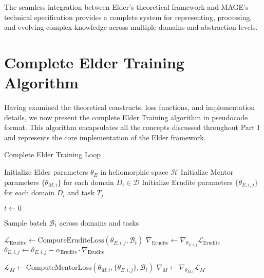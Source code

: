 The seamless integration between Elder's theoretical framework and MAGE's technical specification provides a complete system for representing, processing, and evolving complex knowledge across multiple domains and abstraction levels.

\section{Complete Elder Training Algorithm}

Having examined the theoretical constructs, loss functions, and implementation details, we now present the complete Elder Training algorithm in pseudocode format. This algorithm encapsulates all the concepts discussed throughout Part I and represents the core implementation of the Elder framework.

\begin{algorithm}
\caption{Complete Elder Training Loop}
\label{alg:elder_training}
\begin{algorithmic}[1]

\State Initialize Elder parameters $\theta_E$ in heliomorphic space $\mathcal{H}$
\State Initialize Mentor parameters $\{\theta_{M,i}\}$ for each domain $D_i \in \mathcal{D}$
\State Initialize Erudite parameters $\{\theta_{E,i,j}\}$ for each domain $D_i$ and task $T_j$

\State $t \gets 0$ 

 
    \State Sample batch $\mathcal{B}_t$ across domains and tasks
    
            \State $\mathcal{L}_{\text{Erudite}} \gets \text{ComputeEruditeLoss}(\theta_{E,i,j}, \mathcal{B}_t)$
            \State $\nabla_{\text{Erudite}} \gets \nabla_{\theta_{E,i,j}}\mathcal{L}_{\text{Erudite}}$
            \State $\theta_{E,i,j} \gets \theta_{E,i,j} - \alpha_{\text{Erudite}} \cdot \nabla_{\text{Erudite}}$
            
            \State $\mathcal{L}_M \gets \text{ComputeMentorLoss}(\theta_{M,i}, \{\theta_{E,i,j}\}, \mathcal{B}_t)$
            \State $\nabla_M \gets \nabla_{\theta_{M,i}}\mathcal{L}_M$
        \EndFor
        

\end{algorithmic}
\end{algorithm}
